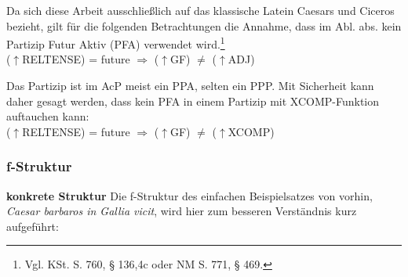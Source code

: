 \documentclass[12pt,a4paper]{article}
\begin{document}


Da sich diese Arbeit ausschließlich auf das klassische Latein Caesars und Ciceros bezieht, gilt für die folgenden Betrachtungen die Annahme, dass im Abl. abs. kein Partizip Futur Aktiv (PFA) verwendet wird.\footnote{Vgl. KSt. S. 760, § 136,4c oder NM S. 771, § 469.}\\
($\uparrow$RELTENSE) = future $\Rightarrow$ ($\uparrow$GF) $\neq$ ($\uparrow$ADJ)

Das Partizip ist im AcP meist ein PPA, selten ein PPP. Mit Sicherheit kann daher gesagt werden, dass kein PFA in einem Partizip mit XCOMP-Funktion auftauchen kann: \\
($\uparrow$RELTENSE) = future $\Rightarrow$ ($\uparrow$GF) $\neq$ ($\uparrow$XCOMP)




\subsubsection{f-Struktur}

\textbf{konkrete Struktur}
Die f-Struktur des einfachen Beispielsatzes von vorhin, \textit{Caesar barbaros in Gallia vicit}, wird hier zum besseren Verständnis kurz aufgeführt: \\
\end{document}
